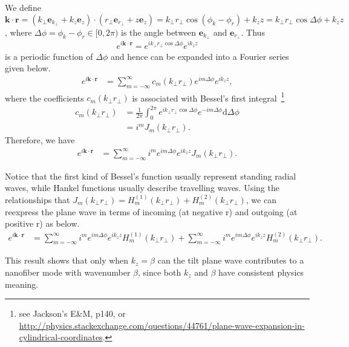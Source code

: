 We define $ \mathbf{k}\cdot\mathbf{r}=(k\!_{\perp}\mathbf{e}\!_{k\!_\perp}+k_z\mathbf{e}_{z}) \cdot(r\!_{\perp}\mathbf{e}\!_{r\!_\perp}+z\mathbf{e}_{z}) = k\!_{\perp}r\!_{\perp}\cos(\phi_{k}-\phi_{r})+k_{z}{z}= k\!_\perp r\!_\perp \cos \Delta\phi +k_{z}{z}$, where $ \Delta\phi=\phi_{k}-\phi_{r} \in [0,2\pi)$ is the angle between $ \mathbf{e}_{k\!_\perp} $ and $ \mathbf{e}_{r\!_\perp} $. Thus
\begin{align}
e^{i\mathbf{k}\cdot \mathbf{r}}=e^{ik\!_\perp r\!_\perp\cos\Delta\phi}e^{ik_{z}{z}}
\end{align}
is a periodic function of $ \Delta\phi $ and hence can be expanded into a Fourier series given below. 
\begin{align}
e^{i\mathbf{k}\cdot \mathbf{r}} &= \sum_{m=-\infty}^{\infty}c_{m}(k\!_\perp r\!_\perp)e^{im\Delta\phi}e^{ik_{z}{z}},
\end{align}
where the coefficients $ c_{m}(k\!_\perp r\!_\perp) $ is associated with Bessel's first integral~\footnote{see Jackson's E\&M, p140, or \url{http://physics.stackexchange.com/questions/44761/plane-wave-expansion-in-cylindrical-coordinates}.}
\begin{align}
c_{m}(k\!_\perp r\!_\perp)&= \frac{1}{2\pi} \int_0^{2\pi} e^{ik\!_\perp r\!_\perp\cos \Delta\phi}e^{-im\Delta\phi}\mathrm{d}\Delta\phi\\
&=i^mJ_m(k\!_\perp r\!_\perp).
\end{align}
Therefore, we have
\begin{align}
e^{i\mathbf{k}\cdot \mathbf{r}} &=\sum_{m=-\infty}^{\infty}i^me^{im\Delta\phi}e^{ik_{z}{z}}J_m(k\!_\perp r\!_\perp).
\end{align}

Notice that the first kind of Bessel's function usually represent standing radial waves, while Hankel functions usually describe travelling waves. Using the relationships that $ J_{m}(k\!_\perp r\!_\perp)=H_{m}^{(1)}(k\!_\perp r\!_\perp)+H_{m}^{(2)}(k\!_\perp r\!_\perp) $, we can reexpress the plane wave in terms of incoming (at negative r) and outgoing (at positive r) as below.
\begin{align}
e^{i\mathbf{k}\cdot \mathbf{r}} &=\sum_{m=-\infty}^{\infty}i^me^{im\Delta\phi}e^{ik_{z}{z}} H_{m}^{(1)}(k\!_\perp r\!_\perp)+\sum_{m=-\infty}^{\infty}i^me^{im\Delta\phi}e^{ik_{z}{z}} H_{m}^{(2)}(k\!_\perp r\!_\perp).
\end{align}

This result shows that only when $ k_z=\beta $ can the tilt plane wave contributes to a nanofiber mode with wavenumber $ \beta $, since both $ k_z $ and $ \beta $ have consistent physics meaning. 